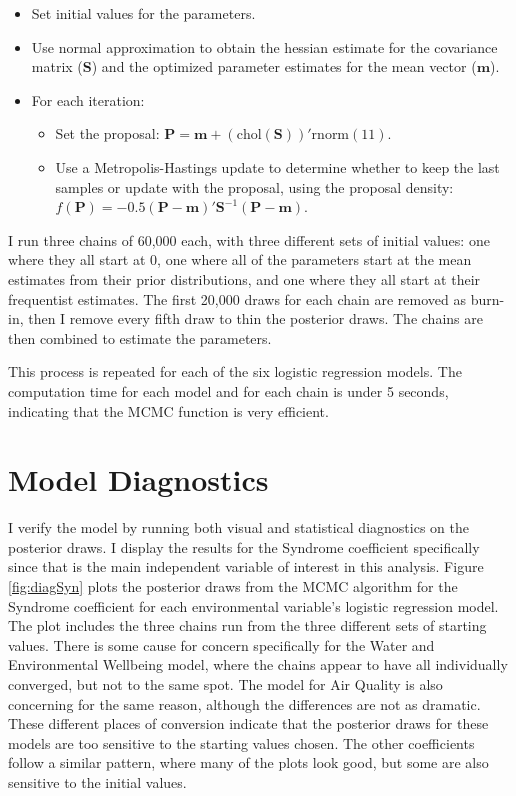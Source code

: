 \documentclass[letterpaper,10.5pt]{article}
\begin{document}
\begin{itemize}
\item Set initial values for the parameters.
\item Use normal approximation to obtain the hessian estimate for the covariance matrix ($\mathbf{S}$) and the optimized parameter estimates for the mean vector ($\mathbf{m}$).
\item For each iteration: 
\begin{itemize}
\item Set the proposal: $\mathbf{P} = \mathbf{m} + (\text{chol}(\mathbf{S}))'\text{rnorm}(11)$.
\item Use a Metropolis-Hastings update to determine whether to keep the last samples or update with the proposal, using the proposal density: $f(\mathbf{P}) = -0.5(\mathbf{P}-\mathbf{m})'\mathbf{S}^{-1}(\mathbf{P}-\mathbf{m})$.
\end{itemize}
\end{itemize}

I run three chains of 60,000 each, with three different sets of initial values: one where they all start at 0, one where all of the parameters start at the mean estimates from their prior distributions, and one where they all start at their frequentist estimates. The first 20,000 draws for each chain are removed as burn-in, then I remove every fifth draw to thin the posterior draws. The chains are then combined to estimate the parameters. 

This process is repeated for each of the six logistic regression models. The computation time for each model and for each chain is under 5 seconds, indicating that the MCMC function is very efficient.

\section{Model Diagnostics}

I verify the model by running both visual and statistical diagnostics on the posterior draws. I display the results for the Syndrome coefficient specifically since that is the main independent variable of interest in this analysis. Figure \ref{fig:diagSyn} plots the posterior draws from the MCMC algorithm for the Syndrome coefficient for each environmental variable's logistic regression model. The plot includes the three chains run from the three different sets of starting values. There is some cause for concern specifically for the Water and Environmental Wellbeing model, where the chains appear to have all individually converged, but not to the same spot. The model for Air Quality is also concerning for the same reason, although the differences are not as dramatic. These different places of conversion indicate that the posterior draws for these models are too sensitive to the starting values chosen. The other coefficients follow a similar pattern, where many of the plots look good, but some are also sensitive to the initial values.
\end{document}
